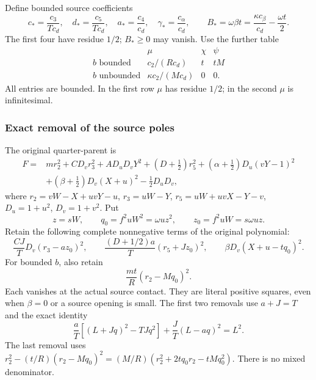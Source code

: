 Define bounded source coefficients
\[
 c_*=\frac{c_3}{Tc_d},\quad d_*=\frac{c_5}{Tc_d},\quad
 a_*=\frac{c_4}{c_d},\quad \gamma_*=\frac{c_\alpha}{c_d},
 \qquad B_*=\omega\beta t
              =\frac{\kappa c_\beta}{c_d}-\frac{\omega t}{2}.
                                                               \tag{EZ4}
\]
The first four have residue $1/2$; $B_*\geq0$ may vanish.
Use the further table
\[
\begin{array}{c|ccc}
 &\mu&\chi&\psi\\ \hline
 b\text{ bounded}&c_2/(Rc_d)&t&tM\\
 b\text{ unbounded}&\kappa c_2/(Mc_d)&0&0 .
\end{array}                                                     \tag{EZ5}
\]
All entries are bounded. In the first row $\mu$ has residue
$1/2$; in the second $\mu$ is infinitesimal.

\subsubsection*{Exact removal of the source poles}

The original quarter-parent is
\[
\begin{split}
 F={}&mr_2^2+CD_vr_3^2+AD_uD_vY^2
 +(D+\tfrac12)r_5^2+(\alpha+\tfrac12)D_u(vY-1)^2\\
 &+(\beta+\tfrac12)D_v(X+u)^2-\tfrac12D_uD_v,
\end{split}                                                     \tag{EZ6}
\]
where $r_2=vW-X+uvY-u$, $r_3=uW-Y$,
$r_5=uW+uvX-Y-v$, $D_u=1+u^2$, $D_v=1+v^2$.
Put
\[
 z=sW,\qquad q_0=f^2uW^2=\omega uz^2,\qquad
 z_0=f^2uW=s\omega uz.
\]
Retain the following complete nonnegative terms of the original
polynomial:
\[
 \frac{CJ}{T}D_v(r_3-az_0)^2,\qquad
 \frac{(D+1/2)a}{T}(r_5+Jz_0)^2,\qquad
 \beta D_v(X+u-tq_0)^2.                                        \tag{EZ7}
\]
For bounded $b$, also retain
\[
                       \frac{mt}{R}(r_2-Mq_0)^2.              \tag{EZ8}
\]
Each vanishes at the actual source contact. They are literal
positive squares, even when $\beta=0$ or a source opening is small.
The first two removals use $a+J=T$ and the exact identity
\[
 \frac aT[(L+Jq)^2-TJq^2]+\frac JT(L-aq)^2=L^2.
\]
The last removal uses
$r_2^2-(t/R)(r_2-Mq_0)^2
=(M/R)(r_2^2+2tq_0r_2-tMq_0^2)$.
There is no mixed denominator.


